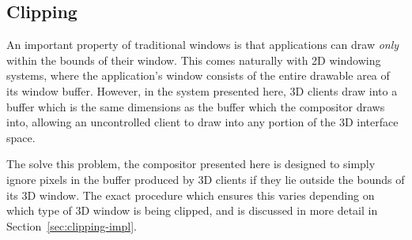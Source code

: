 \subsection{Clipping}
\label{sec:clipping}

An important property of traditional windows is that applications can draw \textit{only} within the bounds of their window. This comes naturally with 2D windowing systems, where the application's window consists of the entire drawable area of its window buffer. However, in the system presented here, 3D clients draw into a buffer which is the same dimensions as the buffer which the compositor draws into, allowing an uncontrolled client to draw into any portion of the 3D interface space.

The solve this problem, the compositor presented here is designed to simply ignore pixels in the buffer produced by 3D clients if they lie outside the bounds of its 3D window. The exact procedure which ensures this varies depending on which type of 3D window is being clipped, and is discussed in more detail in Section~\ref{sec:clipping-impl}.
